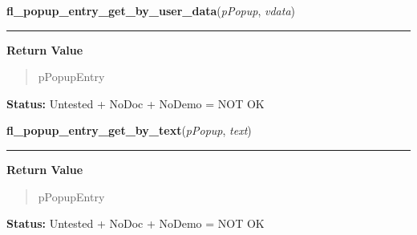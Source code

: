     \label{xformslib:library:fl_popup_entry_get_by_user_data}

    \vspace{0.5ex}

\hspace{.8\funcindent}\begin{boxedminipage}{\funcwidth}

    \raggedright \textbf{fl\_popup\_entry\_get\_by\_user\_data}(\textit{pPopup}, \textit{vdata})

    \vspace{-1.5ex}

    \rule{\textwidth}{0.5\fboxrule}
\setlength{\parskip}{2ex}
\setlength{\parskip}{1ex}
      \textbf{Return Value}
    \vspace{-1ex}

      \begin{quote}
      pPopupEntry

      \end{quote}

\textbf{Status:} Untested + NoDoc + NoDemo = NOT OK



    \end{boxedminipage}

    \label{xformslib:library:fl_popup_entry_get_by_text}

    \vspace{0.5ex}

\hspace{.8\funcindent}\begin{boxedminipage}{\funcwidth}

    \raggedright \textbf{fl\_popup\_entry\_get\_by\_text}(\textit{pPopup}, \textit{text})

    \vspace{-1.5ex}

    \rule{\textwidth}{0.5\fboxrule}
\setlength{\parskip}{2ex}
\setlength{\parskip}{1ex}
      \textbf{Return Value}
    \vspace{-1ex}

      \begin{quote}
      pPopupEntry

      \end{quote}

\textbf{Status:} Untested + NoDoc + NoDemo = NOT OK



    \end{boxedminipage}

